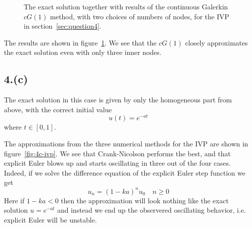 \documentclass{article}
\begin{document}
\begin{figure}
  \begin{center}
  
  \end{center}
  \caption{The exact solution together with results of the continuous Galerkin $cG(1)$ method,
    with two choices of numbers of nodes, for the IVP in section~\ref{sec:question4}. \label{fig:4b-cG1-ivp}}
\end{figure}

The results are shown in figure~\ref{fig:4b-cG1-ivp}.
We see that the $cG(1)$ closely approximates the exact solution
even with only three inner nodes.

\subsection{4.(c)}\label{sec:question4c}

The exact solution in this case is given by only the homogeneous part from above,
with the correct initial value
$$ u(t) = e^{-at} $$
where $t \in [0, 1]$.

The approximations from the three numerical methods for the IVP
are shown in figure~\ref{fig:4c-ivp}.
We see that Crank-Nicolson performs the best,
and that explicit Euler blows up and starts oscillating in three out of the four cases.
Indeed, if we solve the difference equation of the explicit Euler step function we get
$$ u_n = (1 - k a)^n u_0 \quad n \ge 0 $$
Here if $1-ka < 0$ then the approximation will look nothing like
the exact solution $u = e^{-at}$
and instead we end up the observered oscillating behavior,
i.e. explicit Euler will be unstable.
\end{document}
